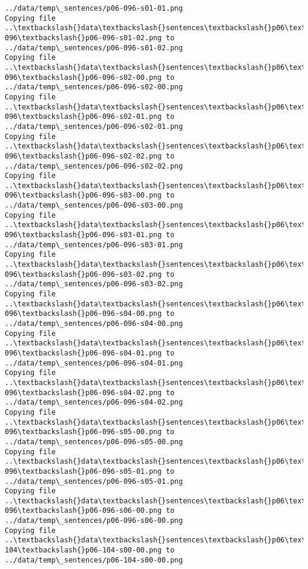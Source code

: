 \documentclass[11pt]{article}
\begin{document}
\begin{Verbatim}[commandchars=\\\{\}]
../data/temp\_sentences/p06-096-s01-01.png
Copying file ..\textbackslash{}data\textbackslash{}sentences\textbackslash{}p06\textbackslash{}p06-096\textbackslash{}p06-096-s01-02.png to
../data/temp\_sentences/p06-096-s01-02.png
Copying file ..\textbackslash{}data\textbackslash{}sentences\textbackslash{}p06\textbackslash{}p06-096\textbackslash{}p06-096-s02-00.png to
../data/temp\_sentences/p06-096-s02-00.png
Copying file ..\textbackslash{}data\textbackslash{}sentences\textbackslash{}p06\textbackslash{}p06-096\textbackslash{}p06-096-s02-01.png to
../data/temp\_sentences/p06-096-s02-01.png
Copying file ..\textbackslash{}data\textbackslash{}sentences\textbackslash{}p06\textbackslash{}p06-096\textbackslash{}p06-096-s02-02.png to
../data/temp\_sentences/p06-096-s02-02.png
Copying file ..\textbackslash{}data\textbackslash{}sentences\textbackslash{}p06\textbackslash{}p06-096\textbackslash{}p06-096-s03-00.png to
../data/temp\_sentences/p06-096-s03-00.png
Copying file ..\textbackslash{}data\textbackslash{}sentences\textbackslash{}p06\textbackslash{}p06-096\textbackslash{}p06-096-s03-01.png to
../data/temp\_sentences/p06-096-s03-01.png
Copying file ..\textbackslash{}data\textbackslash{}sentences\textbackslash{}p06\textbackslash{}p06-096\textbackslash{}p06-096-s03-02.png to
../data/temp\_sentences/p06-096-s03-02.png
Copying file ..\textbackslash{}data\textbackslash{}sentences\textbackslash{}p06\textbackslash{}p06-096\textbackslash{}p06-096-s04-00.png to
../data/temp\_sentences/p06-096-s04-00.png
Copying file ..\textbackslash{}data\textbackslash{}sentences\textbackslash{}p06\textbackslash{}p06-096\textbackslash{}p06-096-s04-01.png to
../data/temp\_sentences/p06-096-s04-01.png
Copying file ..\textbackslash{}data\textbackslash{}sentences\textbackslash{}p06\textbackslash{}p06-096\textbackslash{}p06-096-s04-02.png to
../data/temp\_sentences/p06-096-s04-02.png
Copying file ..\textbackslash{}data\textbackslash{}sentences\textbackslash{}p06\textbackslash{}p06-096\textbackslash{}p06-096-s05-00.png to
../data/temp\_sentences/p06-096-s05-00.png
Copying file ..\textbackslash{}data\textbackslash{}sentences\textbackslash{}p06\textbackslash{}p06-096\textbackslash{}p06-096-s05-01.png to
../data/temp\_sentences/p06-096-s05-01.png
Copying file ..\textbackslash{}data\textbackslash{}sentences\textbackslash{}p06\textbackslash{}p06-096\textbackslash{}p06-096-s06-00.png to
../data/temp\_sentences/p06-096-s06-00.png
Copying file ..\textbackslash{}data\textbackslash{}sentences\textbackslash{}p06\textbackslash{}p06-104\textbackslash{}p06-104-s00-00.png to
../data/temp\_sentences/p06-104-s00-00.png

\end{Verbatim}
\end{document}
